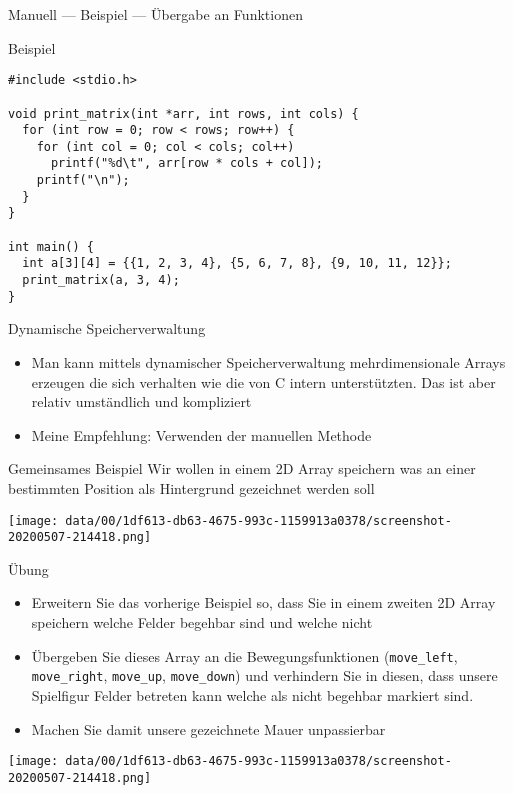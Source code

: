 \documentclass[presentation]{beamer}
\begin{document}
\begin{frame}[label={sec:org5850dae},fragile]{Manuell --- Beispiel --- Übergabe an Funktionen}
 \begin{block}{Beispiel}
\begin{verbatim}
#include <stdio.h>

void print_matrix(int *arr, int rows, int cols) {
  for (int row = 0; row < rows; row++) {
    for (int col = 0; col < cols; col++)
      printf("%d\t", arr[row * cols + col]);
    printf("\n");
  }
}

int main() {
  int a[3][4] = {{1, 2, 3, 4}, {5, 6, 7, 8}, {9, 10, 11, 12}};
  print_matrix(a, 3, 4);
}
\end{verbatim}
\end{block}
\end{frame}

\begin{frame}[label={sec:orgde08fb1}]{Dynamische Speicherverwaltung}
\begin{itemize}
\item Man kann mittels dynamischer Speicherverwaltung mehrdimensionale
Arrays erzeugen die sich verhalten wie die von C intern
unterstützten. Das ist aber relativ umständlich und kompliziert
\item Meine Empfehlung: \alert{Verwenden der manuellen Methode}
\end{itemize}
\end{frame}
\begin{frame}[label={sec:org3e4d9f4}]{Gemeinsames Beispiel}
Wir wollen in einem 2D Array speichern was an einer bestimmten
Position als Hintergrund gezeichnet werden soll
\begin{center}
\texttt{[image: data/00/1df613-db63-4675-993c-1159913a0378/screenshot-20200507-214418.png]}
\end{center}
\end{frame}
\begin{frame}[label={sec:orgc4ef52c},fragile]{Übung}
 \begin{itemize}
\item Erweitern Sie das vorherige Beispiel so, dass Sie in einem zweiten
2D Array speichern welche Felder begehbar sind und welche nicht
\item Übergeben Sie dieses Array an die Bewegungsfunktionen ({\color{solarizedYellow}\verb!move_left!},
{\color{solarizedYellow}\verb!move_right!}, {\color{solarizedYellow}\verb!move_up!}, {\color{solarizedYellow}\verb!move_down!}) und verhindern Sie in diesen,
dass unsere Spielfigur Felder betreten kann welche als nicht
begehbar markiert sind.
\item Machen Sie damit unsere gezeichnete Mauer unpassierbar
\end{itemize}
\begin{center}
\texttt{[image: data/00/1df613-db63-4675-993c-1159913a0378/screenshot-20200507-214418.png]}
\end{center}
\end{frame}
\end{document}
